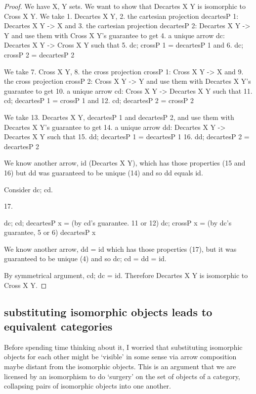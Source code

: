 \documentclass{proc-l}
\theoremstyle{definition}
\theoremstyle{remark}
\numberwithin{equation}{section}
\begin{document}
\begin{proof}



We have X, Y sets. We want to show that Decartes X Y is isomorphic to Cross X Y.
We take 1. Decartes X Y,
2. the cartesian projection decartesP 1: Decartes X Y -> X and
3. the cartesian projection decartesP 2: Decartes X Y -> Y
and use them with Cross X Y's guarantee to get
4. a unique arrow dc: Decartes X Y -> Cross X Y
such that
5. dc; crossP 1 = decartesP 1
and
6. dc; crossP 2 = decartesP 2

We take 7. Cross X Y,
8. the cross projection crossP 1: Cross X Y -> X and
9. the cross projection crossP 2: Cross X Y -> Y
and use them with Decartes X Y's guarantee to get
10. a unique arrow cd: Cross X Y -> Decartes X Y
such that
11. cd; decartesP 1 = crossP 1
and
12. cd; decartesP 2 = crossP 2

We take 13. Decartes X Y, decartesP 1 and decartesP 2,
and use them with Decartes X Y's guarantee to get
14. a unique arrow dd: Decartes X Y -> Decartes X Y
such that
15. dd; decartesP 1 = decartesP 1
16. dd; decartesP 2 = decartesP 2

We know another arrow, id (Decartes X Y), which has those properties (15 and 16)
but dd was guaranteed to be unique (14) and so dd equals id.

Consider dc; cd.

17.

dc; cd; decartesP x
= (by cd's guarantee. 11 or 12)
dc; crossP x
= (by dc's guarantee, 5 or 6)
decartesP x

We know another arrow, dd = id which has those properties (17), 
but it was guaranteed to be unique (4)
and so dc; cd = dd = id.

By symmetrical argument, cd; dc = id. Therefore Decartes X Y is isomorphic to Cross X Y.
\end{proof}

\subsection{substituting isomorphic objects leads to equivalent categories}

Before spending time thinking about it, I worried that substituting isomorphic objects for each other
might be `visible' in some sense via arrow composition maybe distant from the isomorphic objects. This is
an argument that we are licensed by an isomorphism to do `surgery' on the set of objects of a category,
collapsing pairs of isomorphic objects into one another.
\end{document}
